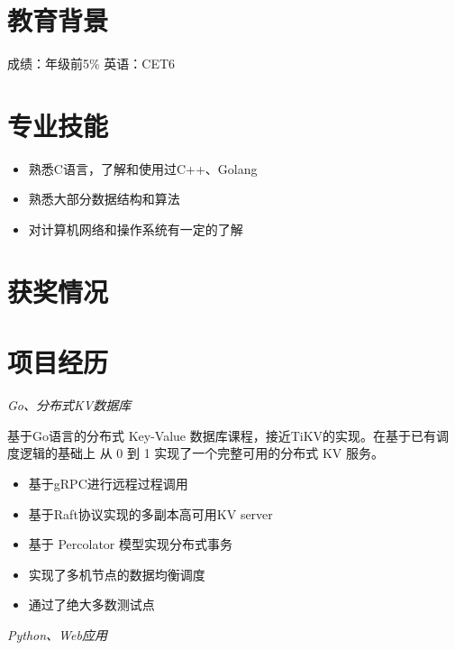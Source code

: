 \documentclass{uniquecv}
\begin{document}

\medskip




\section{教育背景}
成绩：年级前5\% \quad 英语：CET6



\section{专业技能}
\smallskip
\begin{itemize}
\item 熟悉C语言，了解和使用过C++、Golang
\item 熟悉大部分数据结构和算法
\item 对计算机网络和操作系统有一定的了解
\end{itemize}


\section{获奖情况}
\medskip


\section{项目经历}

\textit{Go、分布式KV数据库}
\vspace{0.4ex}


基于Go语言的分布式 Key-Value 数据库课程，接近TiKV的实现。在基于已有调度逻辑的基础上
从 0 到 1 实现了一个完整可用的分布式 KV 服务。
\begin{itemize}
  \item 基于gRPC进行远程过程调用
  \item 基于Raft协议实现的多副本高可用KV server
  \item 基于 Percolator 模型实现分布式事务
  \item 实现了多机节点的数据均衡调度
  \item 通过了绝大多数测试点
\end{itemize}
\textit{Python、Web应用}
\vspace{0.4ex}
\end{document}
